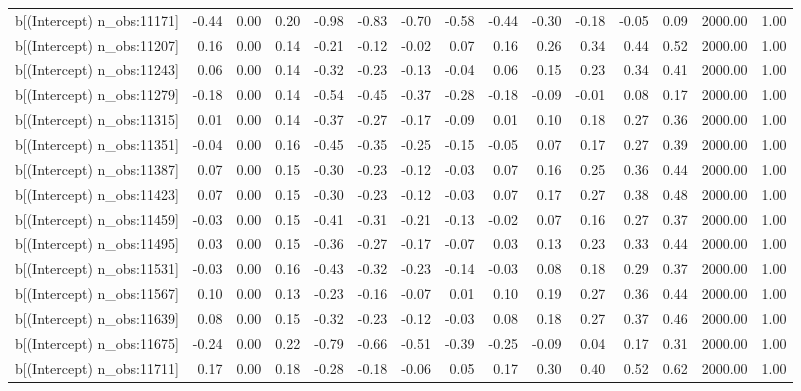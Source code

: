 \begin{table}[ht]
\begin{tabular}{rrrrrrrrrrrrrrr}
  b[(Intercept) n\_obs:11171] & -0.44 & 0.00 & 0.20 & -0.98 & -0.83 & -0.70 & -0.58 & -0.44 & -0.30 & -0.18 & -0.05 & 0.09 & 2000.00 & 1.00 \\ 
  b[(Intercept) n\_obs:11207] & 0.16 & 0.00 & 0.14 & -0.21 & -0.12 & -0.02 & 0.07 & 0.16 & 0.26 & 0.34 & 0.44 & 0.52 & 2000.00 & 1.00 \\ 
  b[(Intercept) n\_obs:11243] & 0.06 & 0.00 & 0.14 & -0.32 & -0.23 & -0.13 & -0.04 & 0.06 & 0.15 & 0.23 & 0.34 & 0.41 & 2000.00 & 1.00 \\ 
  b[(Intercept) n\_obs:11279] & -0.18 & 0.00 & 0.14 & -0.54 & -0.45 & -0.37 & -0.28 & -0.18 & -0.09 & -0.01 & 0.08 & 0.17 & 2000.00 & 1.00 \\ 
  b[(Intercept) n\_obs:11315] & 0.01 & 0.00 & 0.14 & -0.37 & -0.27 & -0.17 & -0.09 & 0.01 & 0.10 & 0.18 & 0.27 & 0.36 & 2000.00 & 1.00 \\ 
  b[(Intercept) n\_obs:11351] & -0.04 & 0.00 & 0.16 & -0.45 & -0.35 & -0.25 & -0.15 & -0.05 & 0.07 & 0.17 & 0.27 & 0.39 & 2000.00 & 1.00 \\ 
  b[(Intercept) n\_obs:11387] & 0.07 & 0.00 & 0.15 & -0.30 & -0.23 & -0.12 & -0.03 & 0.07 & 0.16 & 0.25 & 0.36 & 0.44 & 2000.00 & 1.00 \\ 
  b[(Intercept) n\_obs:11423] & 0.07 & 0.00 & 0.15 & -0.30 & -0.23 & -0.12 & -0.03 & 0.07 & 0.17 & 0.27 & 0.38 & 0.48 & 2000.00 & 1.00 \\ 
  b[(Intercept) n\_obs:11459] & -0.03 & 0.00 & 0.15 & -0.41 & -0.31 & -0.21 & -0.13 & -0.02 & 0.07 & 0.16 & 0.27 & 0.37 & 2000.00 & 1.00 \\ 
  b[(Intercept) n\_obs:11495] & 0.03 & 0.00 & 0.15 & -0.36 & -0.27 & -0.17 & -0.07 & 0.03 & 0.13 & 0.23 & 0.33 & 0.44 & 2000.00 & 1.00 \\ 
  b[(Intercept) n\_obs:11531] & -0.03 & 0.00 & 0.16 & -0.43 & -0.32 & -0.23 & -0.14 & -0.03 & 0.08 & 0.18 & 0.29 & 0.37 & 2000.00 & 1.00 \\ 
  b[(Intercept) n\_obs:11567] & 0.10 & 0.00 & 0.13 & -0.23 & -0.16 & -0.07 & 0.01 & 0.10 & 0.19 & 0.27 & 0.36 & 0.44 & 2000.00 & 1.00 \\ 
  b[(Intercept) n\_obs:11639] & 0.08 & 0.00 & 0.15 & -0.32 & -0.23 & -0.12 & -0.03 & 0.08 & 0.18 & 0.27 & 0.37 & 0.46 & 2000.00 & 1.00 \\ 
  b[(Intercept) n\_obs:11675] & -0.24 & 0.00 & 0.22 & -0.79 & -0.66 & -0.51 & -0.39 & -0.25 & -0.09 & 0.04 & 0.17 & 0.31 & 2000.00 & 1.00 \\ 
  b[(Intercept) n\_obs:11711] & 0.17 & 0.00 & 0.18 & -0.28 & -0.18 & -0.06 & 0.05 & 0.17 & 0.30 & 0.40 & 0.52 & 0.62 & 2000.00 & 1.00 \\ 

\end{tabular}
\end{table}

